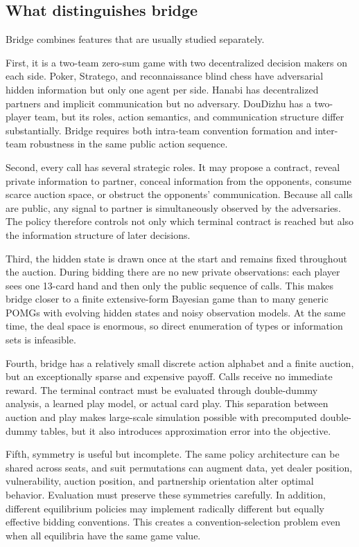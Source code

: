 \documentclass[11pt]{article}
\begin{document}
\subsection{What distinguishes bridge}

Bridge combines features that are usually studied separately.

First, it is a two-team zero-sum game with two decentralized decision makers on each side. Poker, Stratego, and reconnaissance blind chess have adversarial hidden information but only one agent per side. Hanabi has decentralized partners and implicit communication but no adversary. DouDizhu has a two-player team, but its roles, action semantics, and communication structure differ substantially. Bridge requires both intra-team convention formation and inter-team robustness in the same public action sequence.

Second, every call has several strategic roles. It may propose a contract, reveal private information to partner, conceal information from the opponents, consume scarce auction space, or obstruct the opponents' communication. Because all calls are public, any signal to partner is simultaneously observed by the adversaries. The policy therefore controls not only which terminal contract is reached but also the information structure of later decisions.

Third, the hidden state is drawn once at the start and remains fixed throughout the auction. During bidding there are no new private observations: each player sees one 13-card hand and then only the public sequence of calls. This makes bridge closer to a finite extensive-form Bayesian game than to many generic POMGs with evolving hidden states and noisy observation models. At the same time, the deal space is enormous, so direct enumeration of types or information sets is infeasible.

Fourth, bridge has a relatively small discrete action alphabet and a finite auction, but an exceptionally sparse and expensive payoff. Calls receive no immediate reward. The terminal contract must be evaluated through double-dummy analysis, a learned play model, or actual card play. This separation between auction and play makes large-scale simulation possible with precomputed double-dummy tables, but it also introduces approximation error into the objective.

Fifth, symmetry is useful but incomplete. The same policy architecture can be shared across seats, and suit permutations can augment data, yet dealer position, vulnerability, auction position, and partnership orientation alter optimal behavior. Evaluation must preserve these symmetries carefully. In addition, different equilibrium policies may implement radically different but equally effective bidding conventions. This creates a convention-selection problem even when all equilibria have the same game value.
\end{document}
